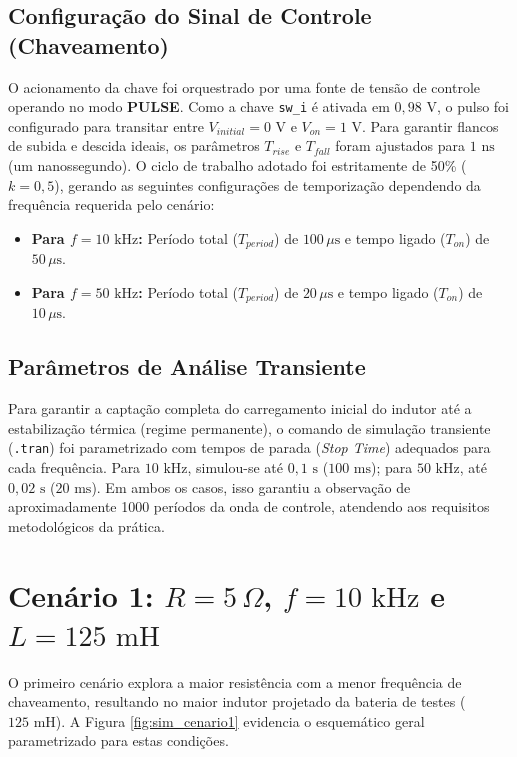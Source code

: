 \subsection{Configuração do Sinal de Controle (Chaveamento)}
O acionamento da chave foi orquestrado por uma fonte de tensão de controle operando no modo \textbf{PULSE}. Como a chave \texttt{sw\_i} é ativada em $0,98\text{ V}$, o pulso foi configurado para transitar entre $V_{initial} = 0\text{ V}$ e $V_{on} = 1\text{ V}$. Para garantir flancos de subida e descida ideais, os parâmetros $T_{rise}$ e $T_{fall}$ foram ajustados para $1\text{ ns}$ (um nanossegundo). 
O ciclo de trabalho adotado foi estritamente de 50\% ($k = 0,5$), gerando as seguintes configurações de temporização dependendo da frequência requerida pelo cenário:
\begin{itemize}
	\item \textbf{Para $f = 10\text{ kHz}$:} Período total ($T_{period}$) de $100\,\mu\text{s}$ e tempo ligado ($T_{on}$) de $50\,\mu\text{s}$.
	\item \textbf{Para $f = 50\text{ kHz}$:} Período total ($T_{period}$) de $20\,\mu\text{s}$ e tempo ligado ($T_{on}$) de $10\,\mu\text{s}$.
\end{itemize}

\subsection{Parâmetros de Análise Transiente}
Para garantir a captação completa do carregamento inicial do indutor até a estabilização térmica (regime permanente), o comando de simulação transiente (\texttt{.tran}) foi parametrizado com tempos de parada (\textit{Stop Time}) adequados para cada frequência. Para $10\text{ kHz}$, simulou-se até $0,1\text{ s}$ ($100\text{ ms}$); para $50\text{ kHz}$, até $0,02\text{ s}$ ($20\text{ ms}$). Em ambos os casos, isso garantiu a observação de aproximadamente 1000 períodos da onda de controle, atendendo aos requisitos metodológicos da prática.

\section{Cenário 1: $R = 5\,\Omega$, $f = 10\text{ kHz}$ e $L = 125\text{ mH}$}

O primeiro cenário explora a maior resistência com a menor frequência de chaveamento, resultando no maior indutor projetado da bateria de testes ($125\text{ mH}$). A Figura \ref{fig:sim_cenario1} evidencia o esquemático geral parametrizado para estas condições.

